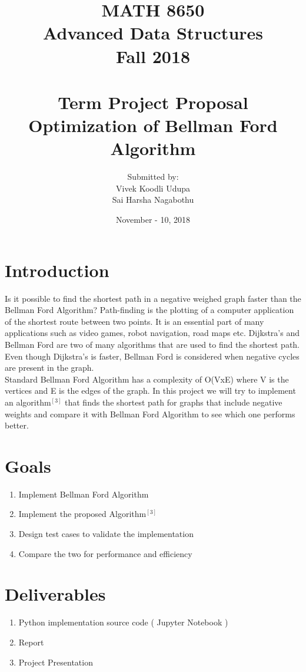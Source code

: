 \documentclass[12pt]{article}
\title{MATH 8650 \\ Advanced Data Structures \\ Fall 2018\\ \quad \\
	Term Project Proposal \\ Optimization of Bellman Ford Algorithm}
\author{Submitted by: 
\\ Vivek Koodli Udupa 
\\ Sai Harsha Nagabothu}
\date{November - 10, 2018 }
\begin{document}
\begin{mdframed}
\maketitle
\end{mdframed}

\section{Introduction}
Is it possible to find the shortest path in a negative weighed graph faster than the Bellman Ford Algorithm? Path-finding is the plotting of a computer application of the shortest route between two points. It is an essential part of many applications such as video games, robot navigation, road maps etc. Dijkstra's and Bellman Ford are two of many algorithms that are used to find the shortest path. Even though Dijkstra's is faster, Bellman Ford is considered when negative cycles are present in the graph. \\
Standard Bellman Ford Algorithm has a complexity of O(VxE) where V is the vertices and E is the edges of the graph. In this project we will try to implement an algorithm$^{[3]}$ that finds the shortest path for graphs that include negative weights and compare it with Bellman Ford Algorithm to see which one performs better.   
\section{Goals}
\begin{enumerate}
	\item Implement Bellman Ford Algorithm
	\item Implement the proposed Algorithm$^{[3]}$
	\item Design test cases to validate the implementation
	\item Compare the two for performance and efficiency
\end{enumerate}

\section{Deliverables}
\begin{enumerate}
	\item Python implementation source code ( Jupyter Notebook )
	\item Report
	\item Project Presentation
\end{enumerate}
\end{document}
